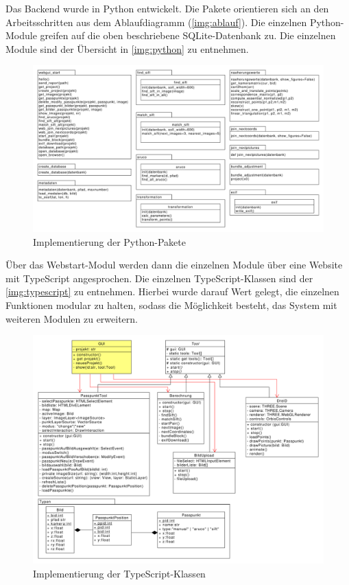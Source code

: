 \documentclass[./00_PhotoBox.tex]{subfiles}
\begin{document}
Das Backend wurde in Python entwickelt. Die Pakete orientieren sich an den Arbeitsschritten aus dem Ablaufdiagramm (\autoref{img:ablauf}). Die einzelnen Python-Module greifen auf die oben beschriebene SQLite-Datenbank zu. Die einzelnen Module sind der Übersicht in \autoref{img:python} zu entnehmen.

\begin{figure}[!htbp]
    \centering
    \includegraphics[width=1\textwidth]{./img/python.pdf}
    \centering
    \caption{Implementierung der Python-Pakete} %
    \label{img:python} %
\end{figure}

Über das Webstart-Modul werden dann die einzelnen Module über eine Website mit TypeScript angesprochen. Die einzelnen TypeScript-Klassen sind der \autoref{img:typescript} zu entnehmen. Hierbei wurde darauf Wert gelegt, die einzelnen Funktionen modular zu halten, sodass die Möglichkeit besteht, das System mit weiteren Modulen zu erweitern.

\begin{figure}[!htbp]
    \centering
    \includegraphics[width=1\textwidth]{./img/typescript.pdf}
    \centering
    \caption{Implementierung der TypeScript-Klassen} %
    \label{img:typescript} %
\end{figure}
\end{document}
